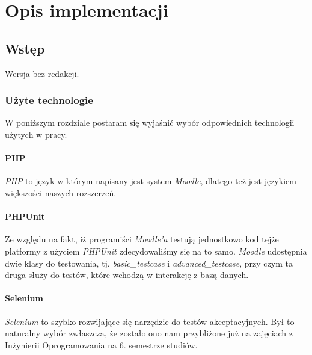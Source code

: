 \chapter{Opis implementacji}
\label{Chapter6}

\section{Wstęp}
\label{Chapter61}

{\color{red}Wersja bez redakcji.}

%
\subsection{Użyte technologie}
W poniższym rozdziale postaram się wyjaśnić wybór odpowiednich technologii użytych w pracy.
\subsubsection{PHP}
\emph{PHP} to język w którym napisany jest system \emph{Moodle}, dlatego też jest językiem większości naszych rozszerzeń.
\subsubsection{PHPUnit}
Ze względu na fakt, iż programiści \emph{Moodle'a} testują jednostkowo kod tejże platformy z użyciem \emph{PHPUnit} zdecydowaliśmy się na to samo. \emph{Moodle} udostępnia dwie klasy do testowania, tj. \emph{basic\_testcase} i \emph{advanced\_testcase}, przy czym ta druga służy do testów, które wchodzą w interakcję z bazą danych.
\subsubsection{Selenium}
\emph{Selenium} to szybko rozwijające się narzędzie do testów akceptacyjnych. Był to naturalny wybór zwłaszcza, że zostało ono nam przybliżone już na zajęciach z Inżynierii Oprogramowania na 6. semestrze studiów.
